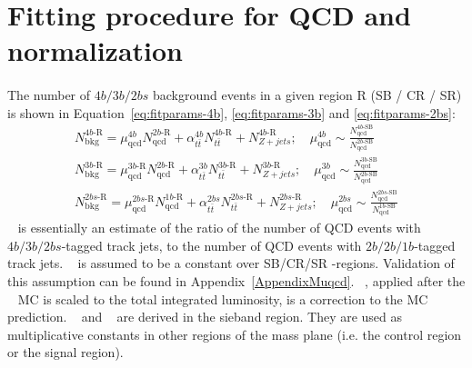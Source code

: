 \section{Fitting procedure for QCD and \ttbar~ normalization}
\label{sec:ttbarnorm}

\paragraph{}
The number of $4b/3b/2bs$ background events in a given region R (SB / CR / SR) is shown in Equation~\ref{eq:fitparams-4b}, \ref{eq:fitparams-3b} and \ref{eq:fitparams-2bs}:
\begin{eqnarray}
\label{eq:fitparams-4b}
N^{4b\text{-R}}_{\text{bkg}} = \mu_{\text{qcd}}^{4b} N^{2b\text{-R}}_{\text{qcd}} + \alpha_{t\bar{t}}^{4b} N^{4b\text{-R}}_{t\bar{t}} + N^{4b\text{-R}}_{Z+jets};
\quad \mu_{\text{qcd}}^{4b} \sim \frac{N^{4b\text{-SB}}_{\text{qcd}}}{N^{2b\text{-SB}}_{\text{qcd}}}
\\
\label{eq:fitparams-3b}
N^{3b\text{-R}}_{\text{bkg}} = \mu_{\text{qcd}}^{3b\text{-R}} N^{2b\text{-R}}_{\text{qcd}} + \alpha_{t\bar{t}}^{3b} N^{3b\text{-R}}_{t\bar{t}} + N^{3b\text{-R}}_{Z+jets} ;
\quad \mu_{\text{qcd}}^{3b} \sim \frac{N^{3b\text{-SB}}_{\text{qcd}}}{N^{2b\text{-SB}}_{\text{qcd}}}\\
\label{eq:fitparams-2bs}
N^{2bs\text{-R}}_{\text{bkg}} = \mu_{\text{qcd}}^{2bs\text{-R}} N^{1b\text{-R}}_{\text{qcd}} + \alpha_{t\bar{t}}^{2bs} N^{2bs\text{-R}}_{t\bar{t}} + N^{2bs\text{-R}}_{Z+jets};
\quad \mu_{\text{qcd}}^{2bs} \sim \frac{N^{2bs\text{-SB}}_{\text{qcd}}}{N^{1b\text{-SB}}_{\text{qcd}}}
\end{eqnarray} 
\muqcd~ is essentially an estimate of the ratio of the number of QCD events with $4b/3b/2bs$-tagged track jets, to the number of QCD events with $2b/2b/1b$-tagged track jets.
\muqcd~ is assumed to be a constant over SB/CR/SR \mleadJ-\msublJ regions.
Validation of this assumption can be found in Appendix~\ref{AppendixMuqcd}.
\alphatt~, applied after the \ttbar~ MC is scaled to the total integrated luminosity, is a correction to the MC prediction.
\muqcd~ and \alphatt~ are derived in the sieband region.
They are used as multiplicative constants in other regions of the mass plane (i.e. the control region or the signal region).

